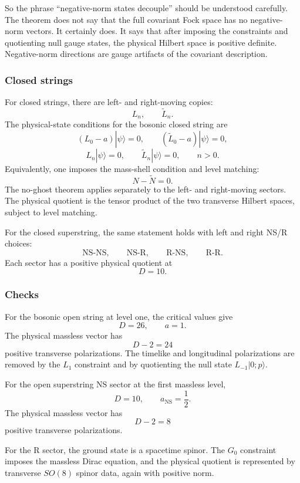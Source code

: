 \documentclass[
  10pt,
  a4paper,
  openany]{book}
\begin{document}
So the phrase ``negative-norm states decouple'' should be understood
carefully. The theorem does not say that the full covariant Fock space
has no negative-norm vectors. It certainly does. It says that after
imposing the constraints and quotienting null gauge states, the physical
Hilbert space is positive definite. Negative-norm directions are gauge
artifacts of the covariant description.

\subsubsection{Closed strings}\label{closed-strings}

For closed strings, there are left- and right-moving copies: \[
L_n,
\qquad
\widetilde L_n.
\] The physical-state conditions for the bosonic closed string are \[
(L_0-a)|\psi\rangle=0,
\qquad
(\widetilde L_0-a)|\psi\rangle=0,
\] \[
L_n|\psi\rangle=0,
\qquad
\widetilde L_n|\psi\rangle=0,
\qquad
n>0.
\] Equivalently, one imposes the mass-shell condition and level
matching: \[
N-\widetilde N=0.
\] The no-ghost theorem applies separately to the left- and right-moving
sectors. The physical quotient is the tensor product of the two
transverse Hilbert spaces, subject to level matching.

For the closed superstring, the same statement holds with left and right
NS/R choices: \[
\text{NS-NS},
\qquad
\text{NS-R},
\qquad
\text{R-NS},
\qquad
\text{R-R}.
\] Each sector has a positive physical quotient at \[
D=10.
\]

\subsubsection{Checks}\label{checks-8}

For the bosonic open string at level one, the critical values give \[
D=26,
\qquad
a=1.
\] The physical massless vector has \[
D-2=24
\] positive transverse polarizations. The timelike and longitudinal
polarizations are removed by the \(L_1\) constraint and by quotienting
the null state \(L_{-1}|0;p\rangle\).

For the open superstring NS sector at the first massless level, \[
D=10,
\qquad
a_{\text{NS}}=\frac{1}{2}.
\] The physical massless vector has \[
D-2=8
\] positive transverse polarizations.

For the R sector, the ground state is a spacetime spinor. The \(G_0\)
constraint imposes the massless Dirac equation, and the physical
quotient is represented by transverse \(SO(8)\) spinor data, again with
positive norm.
\end{document}
